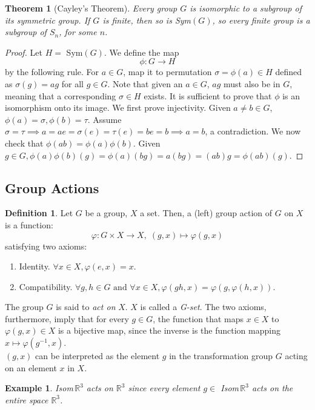 \documentclass{article}
\newtheorem{theorem}{Theorem}[section]
\newtheorem{example}{Example}[section]
\theoremstyle{remark}
\theoremstyle{definition}
\newtheorem{definition}{Definition}[section]
\begin{document}
\begin{theorem}[Cayley's Theorem]
Every group $G$ is isomorphic to a subgroup of its symmetric group. If $G$ is finite, then so is Sym$(G)$, so every finite group is a subgroup of $S_{n}$, for some $n$.
\end{theorem}
\begin{proof}
Let $H =$ Sym$(G)$. We define the map
\[ \phi: G \longrightarrow H \]
by the following rule. For $a \in G$, map it to permutation $\sigma = \phi (a) \in H$ defined as $\sigma(g) = a g$ for all $g \in G$. Note that given an $a \in G$, $a g$ must also be in $G$, meaning that a corresponding $\sigma \in H$ exists. It is sufficient to prove that $\phi$ is an isomorphism onto its image. We first prove injectivity. Given $a \neq b \in G$, $\phi(a)=\sigma, \phi(b) = \tau$. Assume $\sigma = \tau \implies a = a e =  \sigma(e) = \tau (e) = b e = b \implies a = b$, a contradiction. We now check that $\phi(a b) = \phi(a) \phi(b)$. Given $g \in G, \phi(a) \phi(b) (g) = \phi(a) (bg) = a(bg)= (ab) g = \phi(ab) (g).$
\end{proof}

\subsection{Group Actions}
\begin{definition}
Let $G$ be a group, $X$ a set. Then, a (left) group action of $G$ on $X$ is a function: 
\[ \varphi: G \times X \longrightarrow X, \; (g,x) \longmapsto \varphi(g,x)\]
satisfying two axioms:
\begin{enumerate}
    \item Identity. $\forall x \in X, \varphi(e, x) = x$. 
    \item Compatibility. $\forall g, h \in G \text{ and } \forall x \in X, \varphi(gh, x) = \varphi(g, \varphi(h, x))$.
\end{enumerate}
The group $G$ is said to \textit{act on} $X$. $X$ is called a \textit{G-set}. The two axioms, furthermore, imply that for every $g \in G$, the function that maps $x \in X$ to $ \varphi(g, x) \in X$ is a bijective map, since the inverse is the function mapping $x \mapsto \varphi(g^{-1}, x)$. \\
$(g, x)$ can be interpreted as the element $g$ in the transformation group $G$ acting on an element $x$ in $X$.
\end{definition}

\begin{example}
Isom$\,\mathbb{R}^{3}$ acts on $\mathbb{R}^{3}$ since every element $g \in$ Isom$\,\mathbb{R}^{3}$ acts on the entire space $\mathbb{R}^{3}$. 
\end{example}
\end{document}
